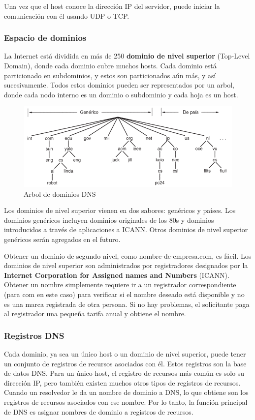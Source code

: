 Una vez que el host conoce la dirección IP del servidor, puede iniciar la comunicación con él usando UDP o TCP.

\subsubsection{Espacio de dominios}
La Internet está dividida en más de 250 \textbf{dominio de nivel superior} (Top-Level Domain), donde cada dominio cubre muchos hosts. Cada dominio está particionado en subdominios, y estos son particionados aún más, y así sucesivamente. Todos estos dominios pueden ser representados por un arbol, donde cada nodo interno es un dominio o subdominio y cada hoja es un host.

\begin{figure}[H]
	\centering
	\includegraphics[width=\textwidth
]{images/dns-tree.png}
	\caption[Arbol de dominios DNS]{Arbol de dominios DNS}
	\label{fig:dns-tree}
\end{figure}

Los dominios de nivel superior vienen en dos sabores: genéricos y países.  Los dominios genéricos incluyen dominios originales de los 80s y dominios introducidos a través de aplicaciones a ICANN. Otros dominios de nivel superior genéricos serán agregados en el futuro.

Obtener un dominio de segundo nivel, como nombre-de-empresa.com, es fácil. Los dominios de nivel superior son administrados por registradores designados por la \textbf{Internet Corporation for Assigned  names and Numbers} (ICANN). Obtener un nombre simplemente requiere ir a un registrador correspondiente (para com en este caso) para verificar si el nombre deseado está disponible y no es una marca registrada de otra persona. Si no hay problemas, el solicitante paga al registrador una pequeña tarifa anual y obtiene el nombre.

\subsubsection{Registros DNS}
Cada dominio, ya sea un único host o un dominio de nivel superior, puede tener un conjunto de registros de recursos asociados con él. Estos registros son la base de datos DNS. Para un único host, el registro de recursos más común es solo su dirección IP, pero también existen muchos otros tipos de registros de recursos. Cuando un resolvedor le da un nombre de dominio a DNS, lo que obtiene son los registros de recursos asociados con ese nombre. Por lo tanto, la función principal de DNS es asignar nombres de dominio a registros de recursos.

